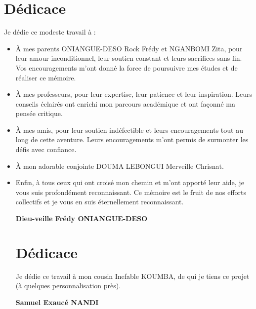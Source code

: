 \chapter*{Dédicace}
Je dédie ce modeste travail à :

\begin{itemize}
  \item {
      À mes parents ONIANGUE-DESO Rock Frédy et NGANBOMI Zita, pour leur amour
      inconditionnel, leur soutien constant et leurs sacrifices sans fin. Vos
      encouragements m’ont donné la force de poursuivre mes études et de réaliser ce mémoire.
    }
  \item {
      À mes professeurs, pour leur expertise, leur patience et leur inspiration.
      Leurs conseils éclairés ont enrichi mon parcours académique et ont façonné ma pensée critique.

    }
  \item {
      À mes amis, pour leur soutien indéfectible et leurs encouragements tout au
      long de cette aventure. Leurs encouragements m’ont permis de surmonter les défis avec confiance.

    }

  \item {
      À mon adorable conjointe DOUMA LEBONGUI Merveille Chrisnat.

    }

  \item {
      Enfin, à tous ceux qui ont croisé mon chemin et m’ont apporté leur aide,
      je vous suis profondément reconnaissant. Ce mémoire est le fruit de nos
      efforts collectifs et je vous en suis éternellement reconnaissant.
    }

    \vspace{0.2cm}
    \begin{flushright}
      \large {
        \textbf {
          Dieu-veille Frédy ONIANGUE-DESO
        }
      }
    \end{flushright}


    \newpage
\chapter*{Dédicace}

    \vspace{2cm}
    Je dédie ce travail à mon cousin  Inefable KOUMBA, de qui je tiens ce 	projet (à quelques personnalisation près).
    \vspace{0.2cm}
    \begin{flushright}
      \large {
        \textbf {
          Samuel Exaucé NANDI
        }
      }
    \end{flushright}

\end{itemize}
